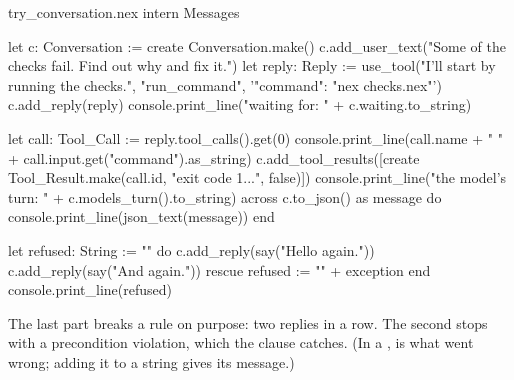 \begin{tryit}{try_conversation.nex}
intern Messages

let c: Conversation := create Conversation.make()
c.add_user_text("Some of the checks fail. Find out why and fix it.")
let reply: Reply := use_tool("I'll start by running the checks.", "run_command",
  '{"command": "nex checks.nex"}')
c.add_reply(reply)
console.print_line("waiting for: " + c.waiting.to_string)

let call: Tool_Call := reply.tool_calls().get(0)
console.print_line(call.name + " " + call.input.get("command").as_string)
c.add_tool_results([create Tool_Result.make(call.id, "exit code 1\n...", false)])
console.print_line("the model's turn: " + c.models_turn().to_string)
across c.to_json() as message do
  console.print_line(json_text(message))
end

let refused: String := ""
do
  c.add_reply(say("Hello again."))
  c.add_reply(say("And again."))
rescue
  refused := "" + exception
end
console.print_line(refused)
\end{tryit}

The last part breaks a rule on purpose: two replies in a row. The second
 stops with a precondition violation, which the
 clause catches. (In a ,  is
what went wrong; adding it to a string gives its message.)

